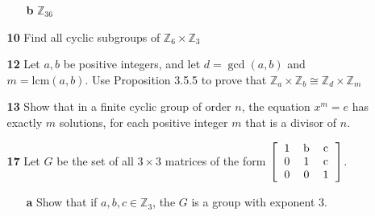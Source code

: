 \documentclass[paper=usletter, fontsize=12pt]{article}
\begin{document}
\begin{itemize}
\begin{itemize}
\begin{enumerate}
\begin{cproof}
                \end{cproof}

                \item[\textbf{b}] $\mathbb{Z}_{36}$
                \begin{cproof}
                \end{cproof}

            \end{enumerate}

            \item[\textbf{10}] Find all cyclic subgroups of $\mathbb{Z}_{6}
            \times \mathbb{Z}_{3}$
            \begin{cproof}
            \end{cproof}

            \item[\textbf{12}] Let $a,b$ be positive integers, and let
            $d=\gcd(a,b)$ and $m=\text{lcm}(a,b)$. Use Proposition 3.5.5 to
            prove that $\mathbb{Z}_{a}\times \mathbb{Z}_{b} \cong
            \mathbb{Z}_{d} \times \mathbb{Z}_{m}$
            \begin{cproof}
            \end{cproof}

            \item[\textbf{13}] Show that in a finite cyclic group of order $n$,
            the equation $x^m=e$ has exactly $m$ solutions, for each positive
            integer $m$ that is a divisor of $n$.
            \begin{cproof}
            \end{cproof}

            \item[\textbf{17}] Let $G$ be the set of all $3\times 3$ matrices
            of the form $\left[\begin{tabular}{ccc}
                    1 & b & c \\
                    0 & 1 & c \\
                    0 & 0 & 1
                \end{tabular}\right]$.

            \begin{itemize}

                \item[\textbf{a}] Show that if $a,b,c\in \mathbb{Z}_3$, the $G$
                is a group with exponent 3.
                \begin{cproof}
                \end{cproof}


\end{itemize}
\end{itemize}
\end{itemize}
\end{document}
